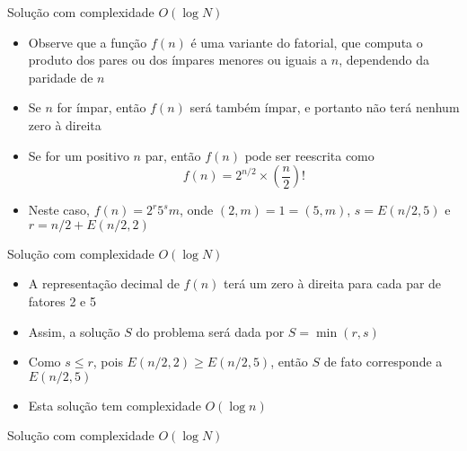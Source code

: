 \begin{frame}[fragile]{Solução com complexidade $O(\log N)$}

    \begin{itemize}
        \item Observe que a função $f(n)$ é uma variante do fatorial, que computa o produto dos
            pares ou dos ímpares menores ou iguais a $n$, dependendo da paridade de $n$

        \item Se $n$ for ímpar, então $f(n)$ será também ímpar, e portanto não terá nenhum zero
            à direita

        \item Se for um positivo $n$ par, então $f(n)$ pode ser reescrita como
        $$
            f(n) = 2^{n/2}\times \left(\frac{n}{2}\right)!
        $$

        \item Neste caso, $f(n) = 2^r5^sm$, onde $(2, m) = 1 = (5, m)$, $s = E(n/2, 5)$ e $r = n/2 + E(n/2, 2)$

    \end{itemize}

\end{frame}

\begin{frame}[fragile]{Solução com complexidade $O(\log N)$}

    \begin{itemize}
        \item A representação decimal de $f(n)$ terá um zero à direita para cada par de fatores 2 e 
            5

        \item Assim, a solução $S$ do problema será dada por $S = \min(r, s)$

        \item Como $s\leq r$, pois $E(n/2, 2)\geq E(n/2, 5)$, então $S$ de fato corresponde a
            $E(n/2, 5)$

        \item Esta solução tem complexidade $O(\log n)$
    \end{itemize}

\end{frame}

\begin{frame}[fragile]{Solução com complexidade $O(\log N)$}
\end{frame}
